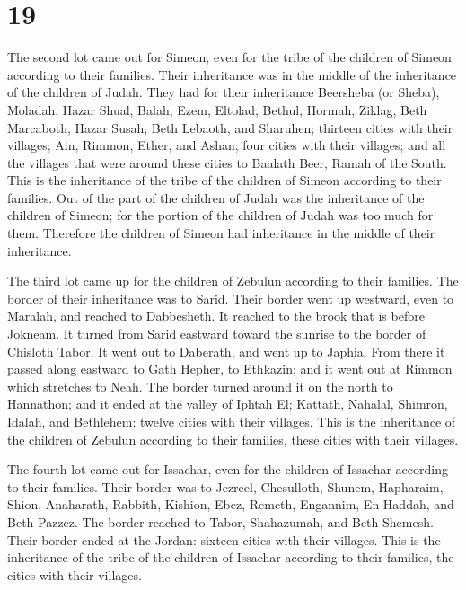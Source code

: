 \hypertarget{section-18}{%
\section{19}\label{section-18}}

 The second lot came out for Simeon, even for the tribe of
the children of Simeon according to their families. Their inheritance
was in the middle of the inheritance of the children of Judah.
 They had for their inheritance Beersheba (or Sheba),
Moladah,  Hazar Shual, Balah, Ezem,  Eltolad,
Bethul, Hormah,  Ziklag, Beth Marcaboth, Hazar Susah,
 Beth Lebaoth, and Sharuhen; thirteen cities with their
villages;  Ain, Rimmon, Ether, and Ashan; four cities with
their villages;  and all the villages that were around these
cities to Baalath Beer, Ramah of the South. This is the inheritance of
the tribe of the children of Simeon according to their families.
 Out of the part of the children of Judah was the
inheritance of the children of Simeon; for the portion of the children
of Judah was too much for them. Therefore the children of Simeon had
inheritance in the middle of their inheritance.

 The third lot came up for the children of Zebulun
according to their families. The border of their inheritance was to
Sarid.  Their border went up westward, even to Maralah, and
reached to Dabbesheth. It reached to the brook that is before Jokneam.
 It turned from Sarid eastward toward the sunrise to the
border of Chisloth Tabor. It went out to Daberath, and went up to
Japhia.  From there it passed along eastward to Gath
Hepher, to Ethkazin; and it went out at Rimmon which stretches to Neah.
 The border turned around it on the north to Hannathon; and
it ended at the valley of Iphtah El;  Kattath, Nahalal,
Shimron, Idalah, and Bethlehem: twelve cities with their villages.
 This is the inheritance of the children of Zebulun
according to their families, these cities with their villages.

 The fourth lot came out for Issachar, even for the
children of Issachar according to their families.  Their
border was to Jezreel, Chesulloth, Shunem,  Hapharaim,
Shion, Anaharath,  Rabbith, Kishion, Ebez, 
Remeth, Engannim, En Haddah, and Beth Pazzez.  The border
reached to Tabor, Shahazumah, and Beth Shemesh. Their border ended at
the Jordan: sixteen cities with their villages.  This is
the inheritance of the tribe of the children of Issachar according to
their families, the cities with their villages.


